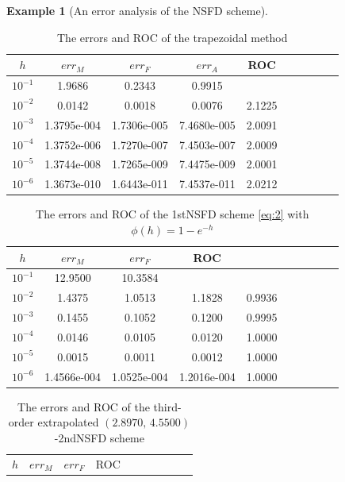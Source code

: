 \documentclass[12pt]{article}
\theoremstyle{definition}
\newtheorem{example}[theorem]{Example}
\theoremstyle{remark}
\numberwithin{equation}{section}
\begin{document}
\begin{example}[An error analysis of the NSFD scheme]
\begin{table}[H]
\begin{center}
\caption{The errors and ROC of the trapezoidal method}\label{Table5}
\begin{tabular}{cccccccccc}
\hline
$h$&$err_M$&$err_F$&$err_A$&ROC\\
\hline
$10^{-1}$& 1.9686&0.2343&0.9915&\\
$10^{-2}$&0.0142&0.0018&0.0076&2.1225\\
$10^{-3}$&1.3795e-004&1.7306e-005&7.4680e-005&2.0091\\
$10^{-4}$&1.3752e-006&1.7270e-007& 7.4503e-007&2.0009 \\
$10^{-5}$&1.3744e-008&1.7265e-009&7.4475e-009&2.0001\\
$10^{-6}$&1.3673e-010&1.6443e-011&7.4537e-011&2.0212\\
\hline
\end{tabular}
\end{center}
\end{table}
\begin{table}[H]
\begin{center}
\caption{The errors and ROC of the 1stNSFD scheme \eqref{eq:2} with $\phi(h) = 1 - e^{-h}$}\label{Table4}
\begin{tabular}{cccccccccc}
\hline
$h$&$err_M$&$err_F$&ROC\\
\hline
$10^{-1}$& 12.9500& 10.3584&\\
$10^{-2}$&1.4375& 1.0513& 1.1828&0.9936\\
$10^{-3}$&0.1455&0.1052&0.1200&0.9995\\
$10^{-4}$&0.0146& 0.0105&0.0120&1.0000\\
$10^{-5}$&0.0015&0.0011&0.0012&1.0000\\
$10^{-6}$&1.4566e-004& 1.0525e-004&1.2016e-004&1.0000\\
\hline
\end{tabular}
\end{center}
\end{table}
\begin{table}[H]
\begin{center}
\caption{The errors and ROC of the third-order extrapolated $(2.8970,\,4.5500)$-2ndNSFD scheme}\label{Table6}
\begin{tabular}{cccccccccc}
\hline
$h$&$err_M$&$err_F$&ROC\\

\end{tabular}
\end{center}
\end{table}
\end{example}
\end{document}
